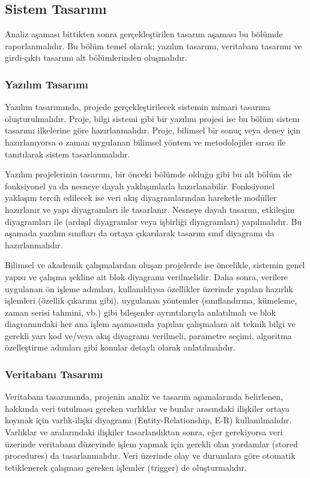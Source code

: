 \subsection{Sistem Tasarımı} 
Analiz aşaması bittikten sonra gerçekleştirilen tasarım aşaması bu bölümde raporlanmalıdır. Bu bölüm temel olarak; yazılım tasarımı, veritabanı tasarımı ve girdi-çıktı tasarımı alt bölümlerinden oluşmalıdır.

\subsubsection{Yazılım Tasarımı}
Yazılım tasarımında, projede gerçekleştirilecek sistemin mimari tasarımı oluşturulmalıdır. Proje, bilgi sistemi gibi bir yazılım projesi ise bu bölüm sistem tasarımı ilkelerine göre hazırlanmalıdır. Proje, bilimsel bir sonuç veya deney için hazırlanıyorsa o zaman uygulanan bilimsel yöntem ve metodolojiler sırası ile tanıtılarak sistem tasarlanmalıdır.

Yazılım projelerinin tasarımı, bir önceki bölümde olduğu gibi bu alt bölüm de fonksiyonel ya da nesneye dayalı yaklaşımlarla hazırlanabilir. Fonksiyonel yaklaşım tercih edilecek ise veri akış diyagramlarından hareketle modüller hazırlanır ve yapı diyagramları ile tasarlanır. Nesneye dayalı tasarım, etkileşim diyagramları ile (ardışıl diyagramlar veya işbirliği diyagramları) yapılmalıdır. Bu aşamada yazılım sınıfları da ortaya çıkarılarak tasarım sınıf diyagramı da hazırlanmalıdır.

Bilimsel ve akademik çalışmalardan oluşan projelerde ise öncelikle, sistemin genel yapısı ve çalışma şekline ait blok diyagramı verilmelidir. Daha sonra, verilere uygulanan ön işleme adımları, kullanıldıysa özellikler üzerinde yapılan hazırlık işlemleri (özellik çıkarımı gibi), uygulanan yöntemler (sınıflandırma, kümeleme, zaman serisi tahmini, vb.) gibi bileşenler ayrıntılarıyla anlatılmalı ve blok diagramındaki her ana işlem aşamasında yapılan çalışmalara ait teknik bilgi ve gerekli yarı kod ve/veya akış diyagramı verilmeli, parametre seçimi, algoritma özelleştirme adımları gibi konular detaylı olarak anlatılmalıdır.

\subsubsection{Veritabanı Tasarımı}
Veritabanı tasarımında, projenin analiz ve tasarım aşamalarında belirlenen, hakkında veri tutulması gereken varlıklar ve bunlar arasındaki ilişkiler ortaya koymak için varlık-ilişki diyagramı (Entity-Relationship, E-R) kullanılmalıdır. Varlıklar ve aralarındaki ilişkiler tasarlandıktan sonra, eğer gerekiyorsa veri üzerinde veritabanı düzeyinde işlem yapmak için gerekli olan yordamlar (stored procedures) da tasarlanmalıdır. Veri üzerinde olay ve durumlara göre otomatik tetiklenerek çalışması gereken işlemler (trigger) de oluşturmalıdır.

